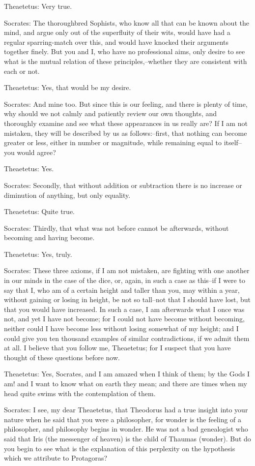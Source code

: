 Theaetetus: Very true.

Socrates: The thoroughbred Sophists, who know all that can be known
about the mind, and argue only out of the superfluity of their wits,
would have had a regular sparring-match over this, and would have
knocked their arguments together finely. But you and I, who have no
professional aims, only desire to see what is the mutual relation of
these principles,--whether they are consistent with each or not.

Theaetetus: Yes, that would be my desire.

Socrates: And mine too. But since this is our feeling, and there is
plenty of time, why should we not calmly and patiently review our own
thoughts, and thoroughly examine and see what these appearances in
us really are? If I am not mistaken, they will be described by us as
follows:--first, that nothing can become greater or less, either in
number or magnitude, while remaining equal to itself--you would agree?

Theaetetus: Yes.

Socrates: Secondly, that without addition or subtraction there is no
increase or diminution of anything, but only equality.

Theaetetus: Quite true.

Socrates: Thirdly, that what was not before cannot be afterwards,
without becoming and having become.

Theaetetus: Yes, truly.

Socrates: These three axioms, if I am not mistaken, are fighting with
one another in our minds in the case of the dice, or, again, in such a
case as this--if I were to say that I, who am of a certain height and
taller than you, may within a year, without gaining or losing in height,
be not so tall--not that I should have lost, but that you would have
increased. In such a case, I am afterwards what I once was not, and yet
I have not become; for I could not have become without becoming, neither
could I have become less without losing somewhat of my height; and I
could give you ten thousand examples of similar contradictions, if
we admit them at all. I believe that you follow me, Theaetetus; for I
suspect that you have thought of these questions before now.

Theaetetus: Yes, Socrates, and I am amazed when I think of them; by the
Gods I am! and I want to know what on earth they mean; and there are
times when my head quite swims with the contemplation of them.

Socrates: I see, my dear Theaetetus, that Theodorus had a true insight
into your nature when he said that you were a philosopher, for wonder
is the feeling of a philosopher, and philosophy begins in wonder. He was
not a bad genealogist who said that Iris (the messenger of heaven)
is the child of Thaumas (wonder). But do you begin to see what is the
explanation of this perplexity on the hypothesis which we attribute to
Protagoras?

